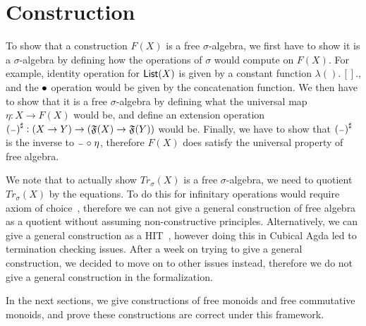 \section{Construction}
To show that a construction $F(X)$ is a free $\sigma$-algebra, we first have to
show it is a $\sigma$-algebra by defining how the operations of $\sigma$
would compute on $F(X)$. For example, identity operation for $\operatorname{\mathsf{List}}(X)$
is given by a constant function $\lambda().\,[].$, and the $\mathbin{\bullet}$ operation
would be given by the concatenation function. We then have to show that
it is a free $\sigma$-algebra by defining what the universal map
$\eta : X \to F(X)$ would be, and define an extension operation
${({\scriptstyle{-}})}^{\sharp} : (X \to Y) \to (\mathfrak{F}(X) \to \mathfrak{F}(Y))$
would be. Finally, we have to show that ${({\scriptstyle{-}})}^{\sharp}$ is the inverse
to ${\scriptstyle{-}} \mathrel{\circ} \eta$, therefore $F(X)$ does satisfy the universal property
of free algebra.

We note that to actually show $Tr_\sigma(X)$ is a free $\sigma$-algebra,
we need to quotient $Tr_\sigma(X)$ by the equations. To do this for
infinitary operations would require axiom of choice~\cite{blassWordsFreeAlgebras1983},
therefore we can not give a general construction of free algebra as a quotient
without assuming non-constructive principles. Alternatively, we can give
a general construction as a HIT~\cite{univalentfoundationsprogramHomotopyTypeTheory2013},
however doing this in Cubical Agda led to termination checking issues.
After a week on trying to give a general construction, we decided to
move on to other issues instead, therefore we do not give a general
construction in the formalization.

In the next sections, we give constructions of 
free monoids and free commutative monoids, and prove these constructions
are correct under this framework.